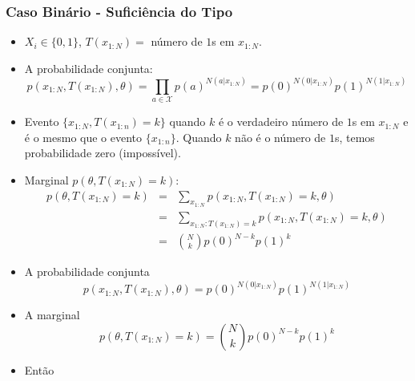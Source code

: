 \begin{frame}[allowframebreaks]
  \frametitle{Caso Binário - Suficiência do Tipo}
  \begin{example}
        \begin{itemize}
                \item $X_i \in \{0,1\}$, $T(x_{1:N}) = $ número de $1$s em $x_{1:N}$.
                \item A probabilidade conjunta:
                \begin{equation}
                p(x_{1:N},T(x_{1:N}),\theta) = \prod_{a \in \mathcal{X}} p(a)^{N(a|x_{1:N})} = p(0)^{ N(0|x_{1:N})} p(1)^{N(1|x_{1:N})}
                \end{equation}
                \item Evento $\{x_{1:N},T(x_{1:n})=k\}$ quando $k$ é o verdadeiro número de $1$s em $x_{1:N}$ 
                e é o mesmo que o evento $\{x_{1:n}\}$. Quando $k$ não é o número de $1$s, temos probabilidade 
                zero (impossível).
        \end{itemize}
        \examplebreak
        \begin{itemize}
                \item Marginal $p(\theta, T(x_{1:N})=k)$:
                \begin{eqnarray}
                p(\theta, T(x_{1:N})=k) &=& \sum_{x_{1:N}} p(x_{1:N}, T(x_{1:N})=k, \theta) \nonumber \\
                        &=& \sum_{x_{1:N} : T(x_{1:N})=k} p(x_{1:N}, T(x_{1:N})=k, \theta) \nonumber \\
                        &=& {N \choose k} p(0)^{N-k} p(1)^k
                \end{eqnarray}
        \end{itemize}
        \examplebreak
        \begin{itemize}
                \item A probabilidade conjunta
                        \begin{equation}
                        p(x_{1:N},T(x_{1:N}),\theta) = p(0)^{ N(0|x_{1:N})} p(1)^{N(1|x_{1:N})}
                        \end{equation}
                \item A marginal
                        \begin{equation}
                        p(\theta, T(x_{1:N})=k) = {N \choose k} p(0)^{N-k} p(1)^k
                        \end{equation}
                \item Então

\end{itemize}
\end{example}
\end{frame}
